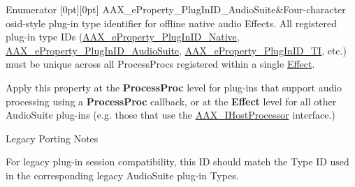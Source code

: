 \begin{DoxyEnumFields}{Enumerator}
[0pt][0pt]{}\mbox{\label{a00662_a13e384f22825afd3db6d68395b79ce0dad3344696b8298a8b254add3d039ea927}} 
A\+A\+X\+\_\+e\+Property\+\_\+\+Plug\+In\+I\+D\+\_\+\+Audio\+Suite&Four-\/character osid-\/style plug-\/in type identifier for offline native audio Effects. All registered plug-\/in type I\+Ds (\mbox{\hyperlink{a00662_a13e384f22825afd3db6d68395b79ce0da89ca3dd6e96895cda14976c1b1ceb826}{A\+A\+X\+\_\+e\+Property\+\_\+\+Plug\+In\+I\+D\+\_\+\+Native}}, \mbox{\hyperlink{a00662_a13e384f22825afd3db6d68395b79ce0dad3344696b8298a8b254add3d039ea927}{A\+A\+X\+\_\+e\+Property\+\_\+\+Plug\+In\+I\+D\+\_\+\+Audio\+Suite}}, \mbox{\hyperlink{a00662_a13e384f22825afd3db6d68395b79ce0da75f174df4efbeca86eaada126c1d9214}{A\+A\+X\+\_\+e\+Property\+\_\+\+Plug\+In\+I\+D\+\_\+\+TI}}, etc.) must be unique across all Process\+Procs registered within a single \mbox{\hyperlink{a01813}{Effect}}.

\begin{DoxyItemize}
\item Apply this property at the {\bfseries{Process\+Proc}} level for plug-\/ins that support audio processing using a {\bfseries{Process\+Proc}} callback, or at the {\bfseries{Effect}} level for all other Audio\+Suite plug-\/ins (e.\+g. those that use the \mbox{\hyperlink{a01833}{A\+A\+X\+\_\+\+I\+Host\+Processor}} interface.)\end{DoxyItemize}
\begin{DoxyRefDesc}{Legacy Porting Notes}
\item[\mbox{\hyperlink{a00787__porting_notes000044}{Legacy Porting Notes}}]For legacy plug-\/in session compatibility, this ID should match the Type ID used in the corresponding legacy Audio\+Suite plug-\/in Types. \end{DoxyRefDesc}
\\
\hline


\end{DoxyEnumFields}
